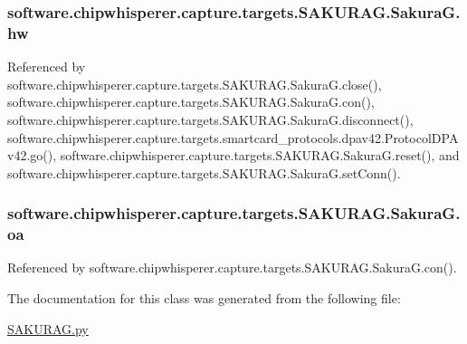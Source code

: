\subsubsection[{hw}]{\setlength{\rightskip}{0pt plus 5cm}software.\+chipwhisperer.\+capture.\+targets.\+S\+A\+K\+U\+R\+A\+G.\+Sakura\+G.\+hw}\label{classsoftware_1_1chipwhisperer_1_1capture_1_1targets_1_1SAKURAG_1_1SakuraG_acaf33f684dd48cf38734cbde5feacfe9}


Referenced by software.\+chipwhisperer.\+capture.\+targets.\+S\+A\+K\+U\+R\+A\+G.\+Sakura\+G.\+close(), software.\+chipwhisperer.\+capture.\+targets.\+S\+A\+K\+U\+R\+A\+G.\+Sakura\+G.\+con(), software.\+chipwhisperer.\+capture.\+targets.\+S\+A\+K\+U\+R\+A\+G.\+Sakura\+G.\+disconnect(), software.\+chipwhisperer.\+capture.\+targets.\+smartcard\+\_\+protocols.\+dpav42.\+Protocol\+D\+P\+Av42.\+go(), software.\+chipwhisperer.\+capture.\+targets.\+S\+A\+K\+U\+R\+A\+G.\+Sakura\+G.\+reset(), and software.\+chipwhisperer.\+capture.\+targets.\+S\+A\+K\+U\+R\+A\+G.\+Sakura\+G.\+set\+Conn().

\hypertarget{classsoftware_1_1chipwhisperer_1_1capture_1_1targets_1_1SAKURAG_1_1SakuraG_aad77970643e7d071044557f9619c552f}{}
\subsubsection[{oa}]{\setlength{\rightskip}{0pt plus 5cm}software.\+chipwhisperer.\+capture.\+targets.\+S\+A\+K\+U\+R\+A\+G.\+Sakura\+G.\+oa}\label{classsoftware_1_1chipwhisperer_1_1capture_1_1targets_1_1SAKURAG_1_1SakuraG_aad77970643e7d071044557f9619c552f}


Referenced by software.\+chipwhisperer.\+capture.\+targets.\+S\+A\+K\+U\+R\+A\+G.\+Sakura\+G.\+con().



The documentation for this class was generated from the following file\+:\begin{DoxyCompactItemize}
\item 
\hyperlink{SAKURAG_8py}{S\+A\+K\+U\+R\+A\+G.\+py}\end{DoxyCompactItemize}
